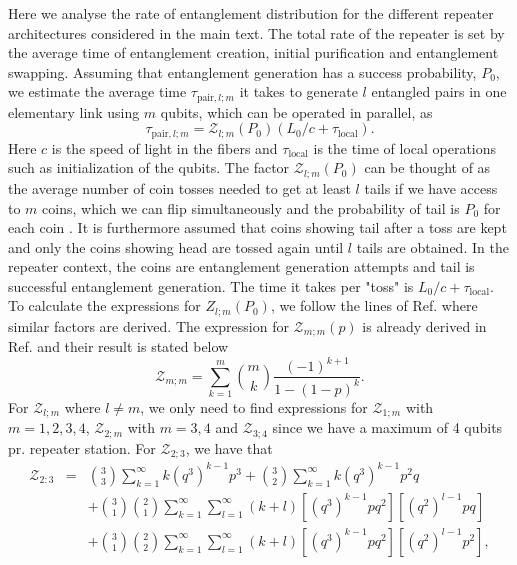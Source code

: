 Here we analyse the rate of entanglement distribution for the different repeater
architectures considered in the main text. The total rate of the repeater is set
by the average time of entanglement creation, initial purification and
entanglement swapping. Assuming that entanglement generation has a success
probability, $P_{0}$, we estimate the average time $\tau_{\text{pair},l;m}$ it
takes to generate $l$ entangled pairs in one elementary link using $m$ qubits,
which can be operated in parallel, as
\begin{equation}
\tau_{\text{pair},l;m}=\mathcal{Z}_{l;m}(P_{0})(L_{0}/c+\tau_{\text{local}}).
\end{equation}
Here $c$ is the speed of light in the fibers and $\tau_{\text{local}}$ is the
time of local operations such as initialization of the qubits. The factor
$\mathcal{Z}_{l;m}(P_{0})$ can be thought of as the average number of coin
tosses needed to get at least $l$ tails if we have access to $m$ coins, which we
can flip simultaneously and the probability of tail is $P_{0}$ for each coin
\cite{bernardes}. It is furthermore assumed that coins showing tail after a toss
are kept and only the coins showing head are tossed again until $l$ tails are
obtained. In the repeater context, the coins are entanglement generation
attempts and tail is successful entanglement generation. The time it takes per
"toss" is $L_{0}/c+\tau_{\text{local}}$. To calculate the expressions for
$Z_{l;m}(P_{0})$, we follow the lines of Ref. \cite{bernardes} where similar
factors are derived. The expression for $\mathcal{Z}_{m;m}(p)$ is already
derived in Ref. \cite{bernardes} and their result is stated below
\begin{equation}
\mathcal{Z}_{m;m}=\sum_{k=1}^{m}\binom{m}{k}\frac{(-1)^{k+1}}{1-(1-p)^{k}}. 
\end{equation}
For $\mathcal{Z}_{l;m}$ where $l\neq m$, we only need to find expressions for
$\mathcal{Z}_{1;m}$ with $m=1,2,3,4$, $\mathcal{Z}_{2;m}$ with $m=3,4$ and
$\mathcal{Z}_{3;4}$ since we have a maximum of 4 qubits pr. repeater station.
For $\mathcal{Z}_{2;3}$, we have that
\begin{eqnarray} \label{eq:suppf}
\mathcal{Z}_{2:3}&=&\binom{3}{3}\sum_{k=1}^{\infty}
k(q^{3})^{k-1}p^{3}+\binom{3}{2}\sum_{k=1}^{\infty} k(q^{3})^{k-1}p^{2}q \qquad
\nonumber \\
&&+\binom{3}{1}\binom{2}{1}\sum_{k=1}^{\infty}
\sum_{l=1}^{\infty}(k+l)[(q^{3})^{k-1}pq^{2}][(q^{2})^{l-1}pq] \nonumber \\
&&+\binom{3}{1}\binom{2}{2}\sum_{k=1}^{\infty}
\sum_{l=1}^{\infty}(k+l)[(q^{3})^{k-1}pq^{2}][(q^{2})^{l-1}p^{2}],
\end{eqnarray}
